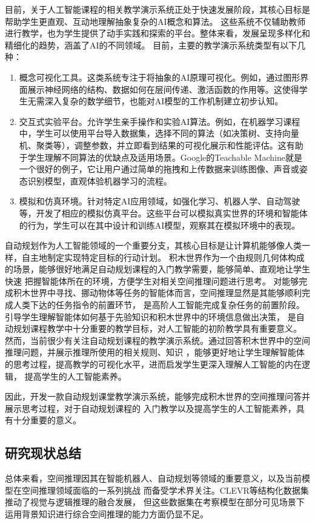 目前，关于人工智能课程的相关教学演示系统正处于快速发展阶段，其核心目标是帮助学生更直观、互动地理解抽象复杂的AI概念和算法。
这些系统不仅辅助教师进行教学，也为学生提供了动手实践和探索的平台。整体来看，发展呈现多样化和精细化的趋势，涵盖了AI的不同领域。
目前，主要的教学演示系统类型有以下几种：
\begin{enumerate}[nosep]
\item 概念可视化工具。这类系统专注于将抽象的AI原理可视化。例如，通过图形界面展示神经网络的结构、数据如何在层间传递、激活函数的作用等。这使得学生无需深入复杂的数学细节，也能对AI模型的工作机制建立初步认知。
\item 交互式实验平台。允许学生亲手操作和实验AI算法。例如，在机器学习课程中，学生可以使用平台导入数据集，选择不同的算法（如决策树、支持向量机、聚类等），调整参数，并立即看到结果的可视化展示和性能评估。这有助于学生理解不同算法的优缺点及适用场景。Google的Teachable Machine就是一个很好的例子，它让用户通过简单的拖拽和上传数据来训练图像、声音或姿态识别模型，直观体验机器学习的流程。
\item 模拟和仿真环境。针对特定AI应用领域，如强化学习、机器人学、自动驾驶等，开发了相应的模拟仿真平台。这些平台可以模拟真实世界的环境和智能体的行为，学生可以在其中设计和训练AI模型，观察其在模拟环境中的表现。
\end{enumerate}

自动规划作为人工智能领域的一个重要分支，其核心目标是让计算机能够像人类一样，自主地制定实现特定目标的行动计划。
积木世界作为一个由规则几何体构成的场景，能够很好地满足自动规划课程的入门教学需要，能够简单、直观地让学生快速
把握智能体所在的环境，方便学生对相关空间推理问题进行思考。
对能够完成积木世界中寻找、挪动物体等任务的智能体而言，空间推理显然是其能够顺利完成人类下达的任务指令的前置环节，
是高阶人工智能完成复杂任务的前置阶段。引导学生理解智能体如何基于先验知识和积木世界中的环境信息做出决策，
是自动规划课程教学中十分重要的教学目标，对人工智能的初阶教学具有重要意义。
然而，当前很少有关注自动规划课程的教学演示系统。通过回答积木世界中的空间推理问题，并展示推理所使用的相关规则、知识
，能够更好地让学生理解智能体的思考过程，提高教学的可视化水平，进而启发学生更深入理解人工智能的内在逻辑，
提高学生的人工智能素养。

因此，开发一款自动规划课堂教学演示系统，能够完成积木世界的空间推理问答并展示思考过程，对于自动规划课程的
入门教学以及提高学生的人工智能素养，具有十分重要的意义。
\subsection{研究现状总结}
总体来看，空间推理因其在智能机器人、自动规划等领域的重要意义，以及当前模型在空间推理领域面临的一系列挑战
而备受学术界关注。CLEVR等结构化数据集推动了视觉与逻辑推理的融合发展，
但这些数据集在考察模型在部分可见场景下运用背景知识进行综合空间推理的能力方面仍显不足。

